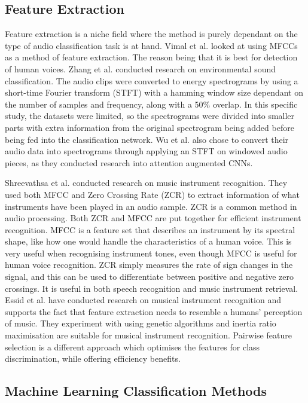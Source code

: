\documentclass[class=report,11pt,crop=false]{standalone}
\begin{document}
\subsection{Feature Extraction} \label{ss: FE}

Feature extraction is a niche field where the method is purely dependant on the type of audio classification task is at hand. Vimal et al. \cite{Vimal_2021} looked at using MFCCs as a method of feature extraction. The reason being that it is best for detection of human voices. Zhang et al. \cite{Zhang2021} conducted research on environmental sound classification. The audio clips were converted to energy spectrograms by using a short-time Fourier transform (STFT) with a hamming window size dependant on the number of samples and frequency, along with a 50\% overlap. In this specific study, the datasets were limited, so the spectrograms were divided into smaller parts with extra information from the original spectrogram being added before being fed into the classification network. Wu et al. \cite{Wu_2018} also chose to convert their audio data into spectrograms through applying an STFT on windowed audio pieces, as they conducted research into attention augmented CNNs. 

Shreevathsa et al. \cite{Shreevathsa_2020} conducted research on music instrument recognition. They used both MFCC and Zero Crossing Rate (ZCR) to extract information of what instruments have been played in an audio sample. ZCR is a common method in audio processing. Both ZCR and MFCC are put together for efficient instrument recognition. MFCC is a feature set that describes an instrument by its spectral shape, like how one would handle the characteristics of a human voice. This is very useful when recognising instrument tones, even though MFCC is useful for human voice recognition. ZCR simply measures the rate of sign changes in the signal, and this can be used to differentiate between positive and negative zero crossings. It is useful in both speech recognition and music instrument retrieval. Essid et al. \cite{Essid_2006} have conducted research on musical instrument recognition and supports the fact that feature extraction needs to resemble a humans’ perception of music. They experiment with using genetic algorithms and inertia ratio maximisation are suitable for musical instrument recognition. Pairwise feature selection is a different approach which optimises the features for class discrimination, while offering efficiency benefits. 

\subsection{Machine Learning Classification Methods} \label{ss: MLCM}
\end{document}
